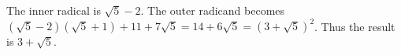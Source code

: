The inner radical is $\sqrt5-2$. The outer radicand becomes $(\sqrt5-2)(\sqrt5+1)+11+7\sqrt5=14+6\sqrt5=(3+\sqrt5)^2$. Thus the result is $\boxed{3+\sqrt5}$.

